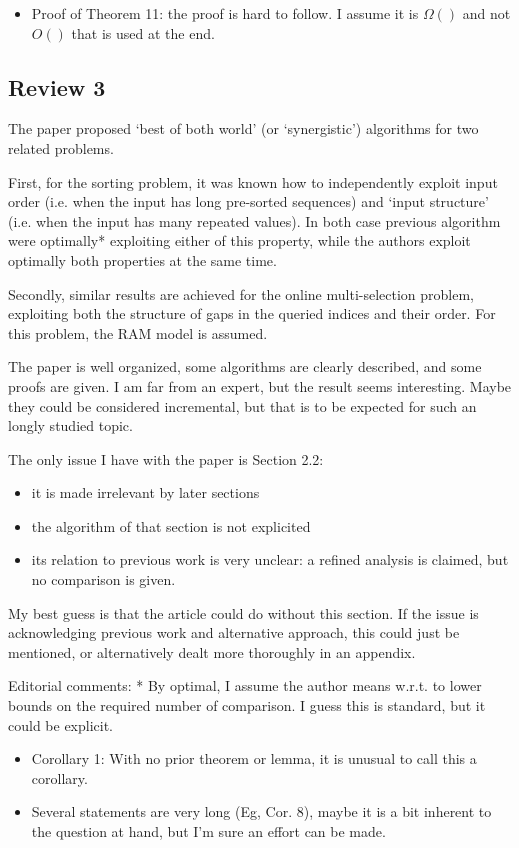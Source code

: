 \begin{appendices}
\begin{itemize}
  \item Proof of Theorem 11: the proof is hard to follow. I assume it
    is $\Omega()$ and not $O()$ that is used at the end.
  \end{itemize}
  
  \subsection{Review 3}

  The paper proposed `best of both world' (or `synergistic')
  algorithms for two related problems.

  First, for the sorting problem, it was known how to independently
  exploit input order (i.e. when the input has long pre-sorted
  sequences) and `input structure' (i.e. when the input has many
  repeated values). In both case previous algorithm were optimally*
  exploiting either of this property, while the authors exploit
  optimally both properties at the same time.

  Secondly, similar results are achieved for the online
  multi-selection problem, exploiting both the structure of gaps in
  the queried indices and their order. For this problem, the RAM model
  is assumed.

  The paper is well organized, some algorithms are clearly described,
  and some proofs are given. I am far from an expert, but the result
  seems interesting. Maybe they could be considered incremental, but
  that is to be expected for such an longly studied topic.

  The only issue I have with the paper is Section 2.2:

  \begin{itemize}
  \item it is made irrelevant by later sections
    
  \item the algorithm of that section is not explicited
    
  \item its relation to previous work is very unclear: a refined
    analysis is claimed, but no comparison is given.
  \end{itemize}
  
  My best guess is that the article could do without this section. If
  the issue is acknowledging previous work and alternative approach,
  this could just be mentioned, or alternatively dealt more thoroughly
  in an appendix.


  Editorial comments: * By optimal, I assume the author means
  w.r.t. to lower bounds on the required number of comparison. I guess
  this is standard, but it could be explicit.

  \begin{itemize}
  \item Corollary 1: With no prior theorem or lemma, it is unusual
    to call this a corollary.
   
  \item Several statements are very long (Eg, Cor. 8), maybe it is a
    bit inherent to the question at hand, but I'm sure an effort can
    be made.
  \end{itemize}
\end{appendices}

